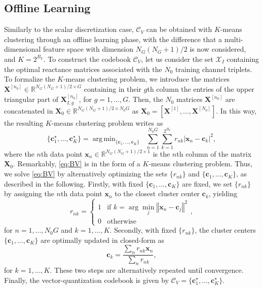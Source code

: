 \documentclass[twocolumn,10pt]{IEEEtran}
\DeclareMathOperator*{\argmin}{arg\,min}
\begin{document}
\subsection{Offline Learning}

Similarly to the scalar discretization case, $\mathcal{C}_V$ can be obtained with $K$-means clustering through an offline learning phase, with the difference that a multi-dimensional feature space with dimension $N_{G}\left(N_{G}+1\right)/2$ is now considered, and $K=2^{B_{V}}$.
%
To construct the codebook $\mathcal{C}_V$, let us consider the set $\mathcal{X}_I$ containing the optimal reactance matrices associated with the $N_0$ training channel triplets.
To formalize the $K$-means clustering problem, we introduce the matrices $\mathbf{X}^{[n_0]}\in\mathbb{R}^{N_{G}\left(N_{G}+1\right)/2\times G}$ containing in their $g$th column the entries of the upper triangular part of $\mathbf{X}_{I,g}^{[n_0]}$, for $g=1,\ldots,G$.
Then, the $N_0$ matrices $\mathbf{X}^{[n_0]}$ are concatenated in $\mathbf{X}_0\in\mathbb{R}^{N_{G}\left(N_{G}+1\right)/2\times N_0G}$ as $\mathbf{X}_0=[\mathbf{X}^{[1]},\ldots,\mathbf{X}^{[N_0]}]$.
In this way, the resulting $K$-means clustering problem writes as
\begin{equation}
\{\mathbf{c}_1^\star,\ldots,\mathbf{c}_K^\star\}=\argmin_{\{\mathbf{c}_1,\ldots,\mathbf{c}_K\}}\;\;\sum_{n=1}^{N_0G}\sum_{k=1}^{2^{B_V}}r_{nk}\left\vert \mathbf{x}_n-\mathbf{c}_k\right\vert^2,\label{eq:BV}
\end{equation}
where the $n$th data point $\mathbf{x}_n\in\mathbb{R}^{N_{G}\left(N_{G}+1\right)/2\times 1}$ is the $n$th column of the matrix $\mathbf{X}_0$.
Remarkably, \eqref{eq:BV} is in the form of a $K$-means clustering problem.
Thus, we solve \eqref{eq:BV} by alternatively optimizing the sets $\{r_{nk}\}$ and $\{\mathbf{c}_1,\ldots,\mathbf{c}_K\}$, as described in the following.
Firstly, with fixed $\{\mathbf{c}_1,\ldots,\mathbf{c}_K\}$ are fixed, we set $\{r_{nk}\}$ by assigning the $n$th data point $\mathbf{x}_n$ to the closest cluster center $\mathbf{c}_k$, yielding
\begin{equation}
r_{nk}=
\begin{cases}
1 & \text{if } k=\arg \min_{j}\left\Vert \mathbf{x}_n-\mathbf{c}_j\right\Vert^2\\
0 & \text{otherwise}
\end{cases},
\end{equation}
for $n=1,\ldots,N_0G$ and $k=1,\ldots,K$.
Secondly, with fixed $\{r_{nk}\}$, the cluster centers $\{\mathbf{c}_1,\ldots,\mathbf{c}_K\}$ are optimally updated in closed-form as
\begin{equation}
\mathbf{c}_k=\frac{\sum_n r_{nk}\mathbf{x}_n}{\sum_n r_{nk}},
\end{equation}
for $k=1,\ldots,K$.
These two steps are alternatively repeated until convergence.
Finally, the vector-quantization codebook is given by $\mathcal{C}_V=\{\mathbf{c}_1^\star,\ldots,\mathbf{c}_{K}^\star\}$.
\end{document}
